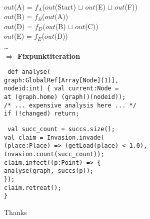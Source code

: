 \documentclass[english,german]{beamer}
\begin{document}
\begin{frame}
 \\
$out$(A) = $f_A$($out$(Start) $\sqcup$ $out$(E) $\sqcup$ $out$(F)) \\
$out$(B) = $f_B$($out$(A)) \\
$out$(D) = $f_D$($out$(B) $\sqcup$ $out$(C)) \\
$out$(E) = $f_E$($out$(D)) \\
\dots \\
\vfill
{\bf\large $\Rightarrow$ Fixpunktiteration}
\end{frame}

\begin{frame}\tt
def analyse( \\
\hspace{0.2cm}	graph:GlobalRef[Array[Node](1)], \\
\hspace{0.2cm}	nodeid:int) \{
\vfill
val current:Node = \\
\hspace{0.2cm}	at (graph.home) (graph()(nodeid)); \\
/* ... expensive analysis here ...  */ \\
if (!changed) return; \\
\vfill
\end{frame}

\begin{frame}\tt
val succ\_count = succs.size(); \\
val claim = Invasion.invade( \\
\hspace{0.2cm}	(place:Place) => (getLoad(place) < 1.0), \\
\hspace{0.2cm}	Invasion.count(succ\_count)); \\
\vfill
claim.infect((p:Point) => \{ \\
\hspace{0.2cm}	analyse(graph, succs(p)); \\
\}); \\
\vfill
claim.retreat(); \\
\}
\end{frame}

\begin{frame}
Thanks
\end{frame}
\end{document}

